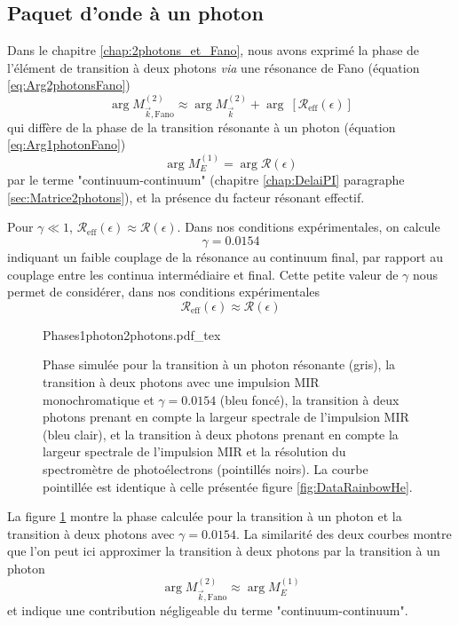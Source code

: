 \subsection{Paquet d'onde à un photon}
Dans le chapitre \ref{chap:2photons_et_Fano}, nous avons exprimé la phase de l'élément de transition à deux photons \textit{via} une résonance de Fano (équation \ref{eq:Arg2photonsFano})
\begin{equation}
\arg M_{\vec{k}, \text{Fano}}^{(2)} \approx \arg M_{\vec{k}}^{(2)} + \arg \: [\mathcal{R}_{\text{eff}}(\epsilon)]
\end{equation}
qui diffère de la phase de la transition résonante à un photon (équation \ref{eq:Arg1photonFano})
\begin{equation}
\arg M^{(1)}_E = \arg \mathcal{R}(\epsilon)
\end{equation}
par le terme "continuum-continuum" (chapitre \ref{chap:DelaiPI} paragraphe \ref{sec:Matrice2photons}), et la présence du facteur résonant effectif.

Pour $\gamma \ll 1$, $\mathcal{R}_{\text{eff}}(\epsilon) \approx \mathcal{R}(\epsilon)$. Dans nos conditions expérimentales, on calcule 
\begin{equation}
\gamma = 0.0154
\end{equation}
indiquant un faible couplage de la résonance au continuum final, par rapport au couplage entre les continua intermédiaire et final. Cette petite valeur de $\gamma$ nous permet de considérer, dans nos conditions expérimentales
\begin{equation}
\mathcal{R}_{\text{eff}}(\epsilon) \approx \mathcal{R}(\epsilon)
\end{equation}

\begin{figure}
\centering
\def\svgwidth{0.5\textwidth}
{Phases1photon2photons.pdf_tex}
\caption{Phase simulée pour la transition à un photon résonante (gris), la transition à deux photons avec une impulsion MIR monochromatique et $\gamma = 0.0154$ (bleu foncé), la transition à deux photons prenant en compte la largeur spectrale de l'impulsion MIR (bleu clair), et la transition à deux photons  prenant en compte la largeur spectrale de l'impulsion MIR et la résolution du spectromètre de photoélectrons (pointillés noirs). La courbe pointillée est identique à celle présentée figure \ref{fig:DataRainbowHe}.} 
\label{fig:Phases1photon2photons}
\end{figure}

La figure \ref{fig:Phases1photon2photons} montre la phase calculée pour la transition à un photon et la transition à deux photons avec $\gamma = 0.0154$. La similarité des deux courbes montre que l'on peut ici approximer la transition à deux photons par la transition à un photon
\begin{equation}
\arg M_{\vec{k}, \text{Fano}}^{(2)} \approx \arg M^{(1)}_E
\end{equation}
et indique une contribution négligeable du terme "continuum-continuum".

